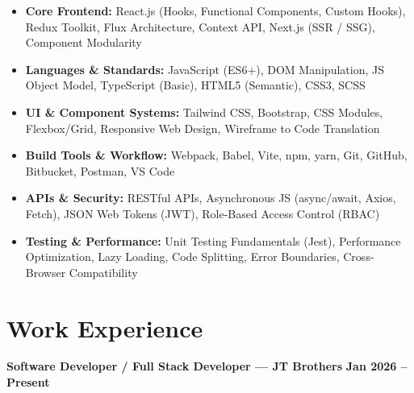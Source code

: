 \documentclass[a4paper,10pt]{article}
\begin{document}
\begin{itemize}

    \item \textbf{Core Frontend:}
    React.js (Hooks, Functional Components, Custom Hooks), Redux Toolkit,
    Flux Architecture, Context API, Next.js (SSR / SSG), Component Modularity

    \item \textbf{Languages \& Standards:}
    JavaScript (ES6+), DOM Manipulation, JS Object Model, TypeScript (Basic),
    HTML5 (Semantic), CSS3, SCSS

    \item \textbf{UI \& Component Systems:}
    Tailwind CSS, Bootstrap, CSS Modules, Flexbox/Grid, Responsive Web Design,
    Wireframe to Code Translation

    \item \textbf{Build Tools \& Workflow:}
    Webpack, Babel, Vite, npm, yarn, Git, GitHub, Bitbucket, Postman, VS Code

    \item \textbf{APIs \& Security:}
    RESTful APIs, Asynchronous JS (async/await, Axios, Fetch),
    JSON Web Tokens (JWT), Role-Based Access Control (RBAC)

    \item \textbf{Testing \& Performance:}
    Unit Testing Fundamentals (Jest), Performance Optimization, Lazy Loading,
    Code Splitting, Error Boundaries, Cross-Browser Compatibility

\end{itemize}

\section*{Work Experience}

\textbf{Software Developer / Full Stack Developer --- JT Brothers}
\hfill
\textbf{Jan 2026 -- Present}
\end{document}
